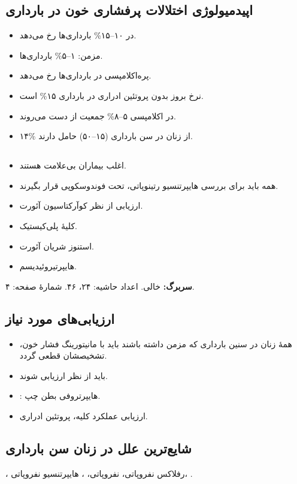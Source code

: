 \documentclass[12pt,a4paper]{article}
\begin{document}
\subsection*{اپیدمیولوژی اختلالات پرفشاری خون در بارداری}
\begin{itemize}
\item {} در ۱۰--۱۵\% بارداری‌ها رخ می‌دهد.
\item {} مزمن: ۱--۵\% بارداری‌ها.
\item پره‌اکلامپسی در  بارداری‌ها رخ می‌دهد.
\item نرخ بروز  بدون پروتئین ادراری در بارداری ۱۵\% است.
\item در اکلامپسی ۵--۸\% جمعیت از دست می‌روند.
\item ۱۴\% از زنان در سن بارداری (۱۵--۵۰) حامل  دارند.
\end{itemize}
\subsection*{}
\begin{itemize}
\item اغلب بیماران بی‌علامت هستند.
\item همه باید برای بررسی هایپرتنسیو رتینوپاتی، تحت فوندوسکوپی قرار بگیرند.
\item ارزیابی از نظر کوآرکتاسیون آئورت.
\item کلیهٔ پلی‌کیستیک.
\item استنوز شریان آئورت.
\item هایپرتیروئیدیسم.
\end{itemize}

\textbf{سربرگ:}  خالی. اعداد حاشیه: ۲۴، ۴۶. شمارهٔ صفحه: ۴.
\subsection*{ارزیابی‌های مورد نیاز}
\begin{itemize}
\item همهٔ زنان در سنین بارداری که  مزمن داشته باشند باید با مانیتورینگ  فشار خون، تشخیصشان قطعی گردد.
\item باید از نظر  ارزیابی شوند.
\item {}: هایپرتروفی بطن چپ.
\item ارزیابی عملکرد کلیه، پروتئین ادراری.
\end{itemize}
\subsection*{شایع‌ترین علل  در زنان سن بارداری}
، رفلاکس نفروپاتی،  نفروپاتی، ، هایپرتنسیو نفروپاتی، .
\end{document}
